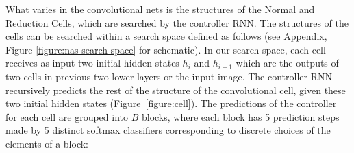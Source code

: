 



What varies in the convolutional nets is the structures of the Normal and Reduction Cells, which are searched by the controller RNN. 
The structures of the cells can be searched within a search space defined as follows (see Appendix, Figure \ref{figure:nas-search-space} for schematic). In our search space, each cell receives as input two initial hidden states $h_i$ and $h_{i-1}$ which are the outputs of two cells in previous two lower layers or the input image. The controller RNN recursively predicts the rest of the structure of the convolutional cell, given these two initial hidden states (Figure~\ref{figure:cell}). The predictions of the controller for each cell are grouped into $B$ blocks, where each block has 5 prediction steps made by 5 distinct softmax classifiers corresponding to discrete choices of the elements of a block:


